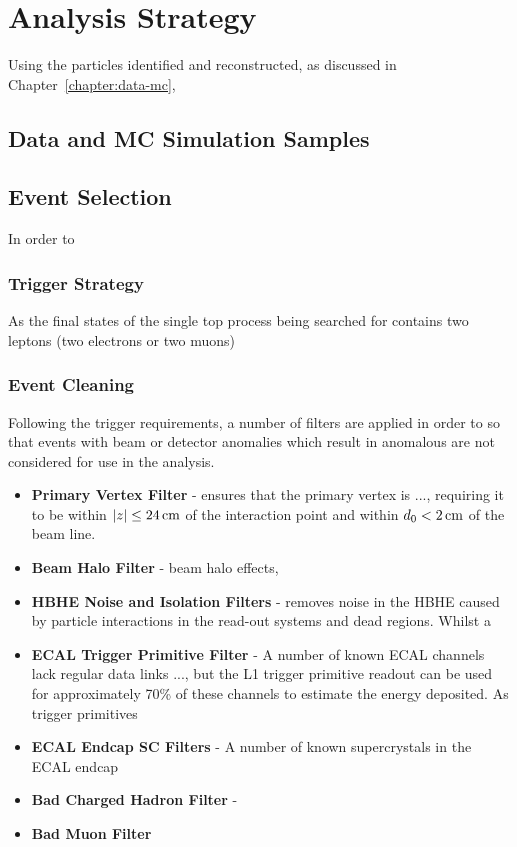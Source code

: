 \chapter{Analysis Strategy }\label{chapter:tzq-search}
Using the particles identified and reconstructed, as discussed in Chapter~\ref{chapter:data-mc}, 

\section{Data and MC Simulation Samples}

\section{Event Selection}
In order to 


\subsection{Trigger Strategy}
As the final states of the single top process being searched for contains two leptons (\ie two electrons or two muons)

\subsection{Event Cleaning}
Following the trigger requirements, a number of filters are applied in order to so that events with beam or detector anomalies which result in anomalous \MET are not considered for use in the analysis.


\begin{itemize}
\item \textbf{Primary Vertex Filter} - ensures that the primary vertex is ..., requiring it to be within $|z| \leq 24\,\text{cm}$ of the interaction point and within $d_{0} < 2\,\text{cm}$ of the beam line.
\item \textbf{Beam Halo Filter} - beam halo effects, 
\item \textbf{HBHE Noise and Isolation Filters} - removes noise in the HBHE caused by particle interactions in the read-out systems and dead regions. Whilst a 
\item \textbf{ECAL Trigger Primitive Filter} - A number of known ECAL channels lack regular data links ..., but the L1 trigger primitive readout can be used for approximately 70\% of these channels to estimate the energy deposited. As trigger primitives 
\item \textbf{ECAL Endcap SC Filters} - A number of known supercrystals in the ECAL endcap 
\item \textbf{Bad Charged Hadron Filter} - 
\item \textbf{Bad Muon Filter}
\end{itemize}


